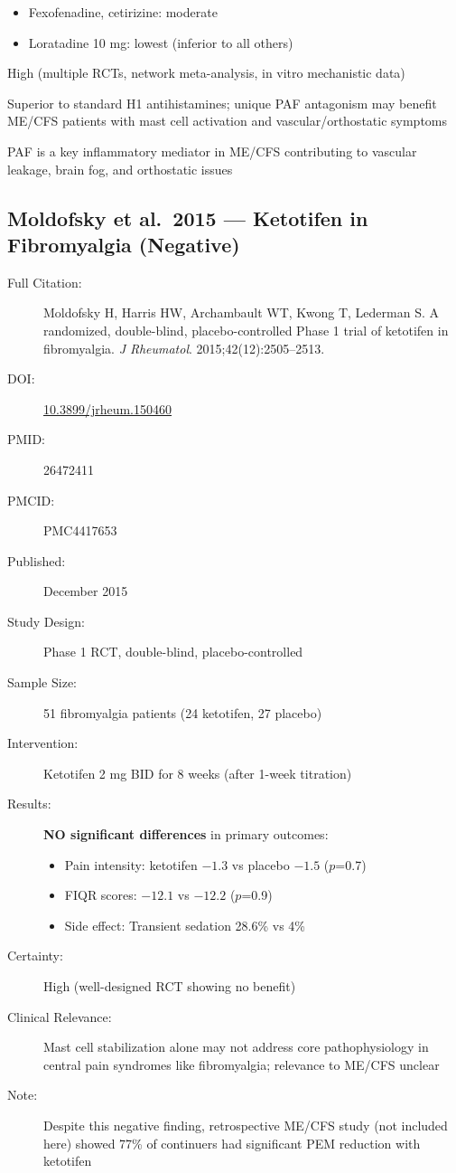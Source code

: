 \begin{description}
\begin{itemize}
        \item Fexofenadine, cetirizine: moderate
        \item Loratadine 10 mg: lowest (inferior to all others)
    \end{itemize}
    \item[Certainty:] High (multiple RCTs, network meta-analysis, in vitro mechanistic data)
    \item[Clinical Relevance:] Superior to standard H1 antihistamines; unique PAF antagonism may benefit ME/CFS patients with mast cell activation and vascular/orthostatic symptoms
    \item[Note:] PAF is a key inflammatory mediator in ME/CFS contributing to vascular leakage, brain fog, and orthostatic issues
\end{description}

\subsection{Moldofsky et al.\ 2015 --- Ketotifen in Fibromyalgia (Negative)}

\begin{description}
    \item[Full Citation:] Moldofsky H, Harris HW, Archambault WT, Kwong T, Lederman S. A randomized, double-blind, placebo-controlled Phase 1 trial of ketotifen in fibromyalgia. \textit{J Rheumatol}. 2015;42(12):2505--2513.
    \item[DOI:] \href{https://doi.org/10.3899/jrheum.150460}{10.3899/jrheum.150460}
    \item[PMID:] 26472411
    \item[PMCID:] PMC4417653
    \item[Published:] December 2015
    \item[Study Design:] Phase 1 RCT, double-blind, placebo-controlled
    \item[Sample Size:] 51 fibromyalgia patients (24 ketotifen, 27 placebo)
    \item[Intervention:] Ketotifen 2 mg BID for 8 weeks (after 1-week titration)
    \item[Results:] \textbf{NO significant differences} in primary outcomes:
    \begin{itemize}
        \item Pain intensity: ketotifen $-1.3$ vs placebo $-1.5$ ($p$=0.7)
        \item FIQR scores: $-12.1$ vs $-12.2$ ($p$=0.9)
        \item Side effect: Transient sedation 28.6\% vs 4\%
    \end{itemize}
    \item[Certainty:] High (well-designed RCT showing no benefit)
    \item[Clinical Relevance:] Mast cell stabilization alone may not address core pathophysiology in central pain syndromes like fibromyalgia; relevance to ME/CFS unclear
    \item[Note:] Despite this negative finding, retrospective ME/CFS study (not included here) showed 77\% of continuers had significant PEM reduction with ketotifen
\end{description}

